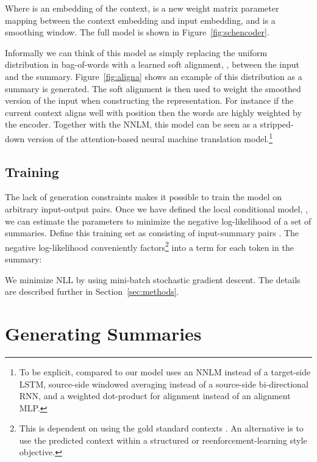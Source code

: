 \documentclass[11pt,a4paper]{article}
\begin{document}
\noindent Where  is an embedding of the
context,  is a new weight matrix parameter mapping
between the context embedding and input embedding, and  is a
smoothing window. The full model is shown in Figure~\ref{fig:schencoder}.

Informally we can think of this model as simply replacing the uniform
distribution in bag-of-words with a learned soft alignment,
, between the input and the summary.
Figure~\ref{fig:aligna} shows an example of this distribution
 as a summary is generated. The soft alignment is then used to
weight the smoothed version of the input  when
constructing the representation. For instance if the current context
aligns well with position  then the words 
are highly weighted by the encoder.
Together with the NNLM, this model can be seen as a stripped-down version of the
attention-based neural machine translation model.\footnote{To be explicit, compared to  our model uses
  an NNLM instead of a target-side LSTM, source-side windowed
  averaging instead of a source-side bi-directional RNN, and a
  weighted dot-product for alignment instead of an alignment MLP.
}



\subsection{Training}
\label{sec:train}
The lack of generation constraints makes it possible to train the
model on arbitrary input-output pairs.  Once we have defined
the local conditional model, ,  we can estimate the parameters to minimize the
negative log-likelihood of a set of summaries. Define this training
set as consisting of  input-summary pairs .  The negative
log-likelihood conveniently factors\footnote{This is dependent on using the gold standard contexts . An alternative is to use the predicted context within a structured or reenforcement-learning style objective.} into a term for each token
in the summary:

\begin{small}

\end{small}

\noindent We minimize NLL by using mini-batch stochastic gradient
descent. The details are described further in
Section~\ref{sec:methods}.
 

\section{Generating Summaries}
\label{sec:additional}
\end{document}
